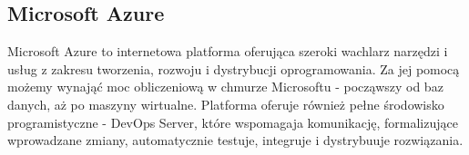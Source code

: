 \subsection{Microsoft Azure}
Microsoft Azure \cite{azure} to internetowa platforma oferująca szeroki wachlarz narzędzi i usług
z zakresu tworzenia, rozwoju i dystrybucji oprogramowania. Za jej pomocą możemy wynająć moc obliczeniową
w chmurze Microsoftu - począwszy od baz danych, aż po maszyny wirtualne. Platforma oferuje również
pełne środowisko programistyczne - DevOps Server, które wspomagaja komunikację, 
formalizujące wprowadzane zmiany, automatycznie testuje, integruje i dystrybuuje rozwiązania.